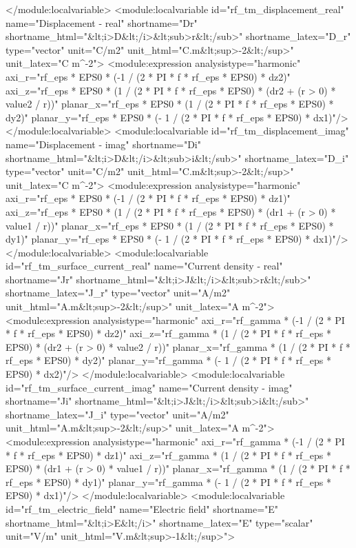 \documentclass[12pt,a4paper,oneside]{article}
\numberwithin{equation}{section} %
\numberwithin{figure}{section} %
\numberwithin{table}{section} %
\begin{document}
\begin{spverbatim}
    </module:localvariable>
    <module:localvariable id="rf_tm_displacement_real" name="Displacement - real" shortname="Dr" shortname_html="&lt;i>D&lt;/i>&lt;sub>r&lt;/sub>" shortname_latex="D_{r}" type="vector" unit="C/m2" unit_html="C.m&lt;sup>-2&lt;/sup>" unit_latex="C \cdot m^{-2}">
      <module:expression analysistype="harmonic" axi_r="rf_eps * EPS0 * (-1 / (2 * PI * f * rf_eps * EPS0) * dz2)" axi_z="rf_eps * EPS0 * (1 / (2 * PI * f * rf_eps * EPS0) * (dr2 + (r > 0) * value2 / r))" planar_x="rf_eps * EPS0 * (1 / (2 * PI * f * rf_eps * EPS0) * dy2)" planar_y="rf_eps * EPS0 * (- 1 / (2 * PI * f * rf_eps * EPS0) * dx1)"/>
    </module:localvariable>
    <module:localvariable id="rf_tm_displacement_imag" name="Displacement - imag" shortname="Di" shortname_html="&lt;i>D&lt;/i>&lt;sub>i&lt;/sub>" shortname_latex="D_{i}" type="vector" unit="C/m2" unit_html="C.m&lt;sup>-2&lt;/sup>" unit_latex="C \cdot m^{-2}">
      <module:expression analysistype="harmonic" axi_r="rf_eps * EPS0 * (-1 / (2 * PI * f * rf_eps * EPS0) * dz1)" axi_z="rf_eps * EPS0 * (1 / (2 * PI * f * rf_eps * EPS0) * (dr1 + (r > 0) * value1 / r))" planar_x="rf_eps * EPS0 * (1 / (2 * PI * f * rf_eps * EPS0) * dy1)" planar_y="rf_eps * EPS0 * (- 1 / (2 * PI * f * rf_eps * EPS0) * dx1)"/>
    </module:localvariable>
    <module:localvariable id="rf_tm_surface_current_real" name="Current density - real" shortname="Jr" shortname_html="&lt;i>J&lt;/i>&lt;sub>r&lt;/sub>" shortname_latex="J_{r}" type="vector" unit="A/m2" unit_html="A.m&lt;sup>-2&lt;/sup>" unit_latex="A \cdot m^{-2}">
      <module:expression analysistype="harmonic" axi_r="rf_gamma * (-1 / (2 * PI * f * rf_eps * EPS0) * dz2)" axi_z="rf_gamma * (1 / (2 * PI * f * rf_eps * EPS0) * (dr2 + (r > 0) * value2 / r))" planar_x="rf_gamma * (1 / (2 * PI * f * rf_eps * EPS0) * dy2)" planar_y="rf_gamma * (- 1 / (2 * PI * f * rf_eps * EPS0) * dx2)"/>
    </module:localvariable>
    <module:localvariable id="rf_tm_surface_current_imag" name="Current density - imag" shortname="Ji" shortname_html="&lt;i>J&lt;/i>&lt;sub>i&lt;/sub>" shortname_latex="J_{i}" type="vector" unit="A/m2" unit_html="A.m&lt;sup>-2&lt;/sup>" unit_latex="A \cdot m^{-2}">
      <module:expression analysistype="harmonic"  axi_r="rf_gamma * (-1 / (2 * PI * f * rf_eps * EPS0) * dz1)" axi_z="rf_gamma * (1 / (2 * PI * f * rf_eps * EPS0) * (dr1 + (r > 0) * value1 / r))" planar_x="rf_gamma * (1 / (2 * PI * f * rf_eps * EPS0) * dy1)" planar_y="rf_gamma * (- 1 / (2 * PI * f * rf_eps * EPS0) * dx1)"/>
    </module:localvariable>
    <module:localvariable id="rf_tm_electric_field" name="Electric field" shortname="E" shortname_html="&lt;i>E&lt;/i>" shortname_latex="E" type="scalar" unit="V/m" unit_html="V.m&lt;sup>-1&lt;/sup>">

\end{spverbatim}
\end{document}
